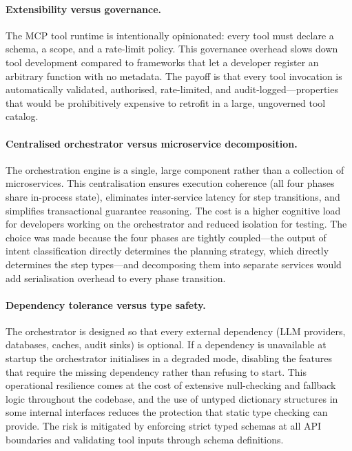 \documentclass[a4paper,noexaminfo]{sapthesis}
\begin{document}
\paragraph{Extensibility versus governance.}
The MCP tool runtime is intentionally opinionated: every tool must declare
a schema, a scope, and a rate-limit policy.  This governance overhead
slows down tool development compared to frameworks that let a developer
register an arbitrary function with no metadata.  The payoff is that every
tool invocation is automatically validated, authorised, rate-limited, and
audit-logged---properties that would be prohibitively expensive to
retrofit in a large, ungoverned tool catalog.

\paragraph{Centralised orchestrator versus microservice decomposition.}
The orchestration engine is a single, large component rather than a
collection of microservices.  This centralisation ensures execution
coherence (all four phases share in-process state), eliminates
inter-service latency for step transitions, and simplifies
transactional guarantee reasoning.  The cost is a higher cognitive load for
developers working on the orchestrator and reduced isolation for testing.
The choice was made because the four phases are tightly coupled---the
output of intent classification directly determines the planning strategy,
which directly determines the step types---and decomposing them into
separate services would add serialisation overhead to every phase
transition.

\paragraph{Dependency tolerance versus type safety.}
The orchestrator is designed so that every external dependency (LLM
providers, databases, caches, audit sinks) is optional.  If a dependency
is unavailable at startup the orchestrator initialises in a degraded mode,
disabling the features that require the missing dependency rather than
refusing to start.  This operational resilience comes at the cost of
extensive null-checking and fallback logic throughout the codebase, and
the use of untyped dictionary structures in some internal interfaces
reduces the protection that static type checking can provide.  The risk
is mitigated by enforcing strict typed schemas at all API boundaries
and validating tool inputs through schema definitions.
\end{document}

